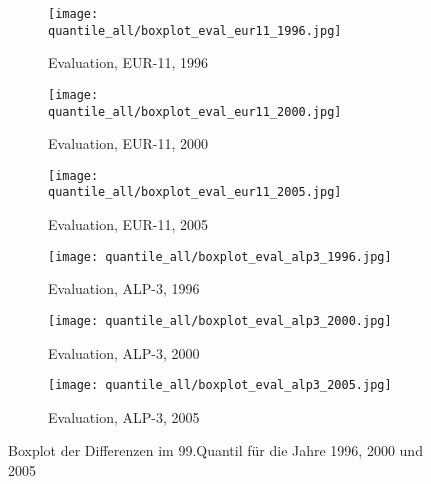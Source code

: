 \begin{figure}
	\begin{subfigure}{0.32\textwidth}
		\texttt{[image: quantile\_all/boxplot\_eval\_eur11\_1996.jpg]}
		\caption{Evaluation, EUR-11, 1996}
	\end{subfigure}
	\begin{subfigure}{0.32\textwidth}
		\texttt{[image: quantile\_all/boxplot\_eval\_eur11\_2000.jpg]}
		\caption{Evaluation, EUR-11, 2000}
	\end{subfigure}
	\begin{subfigure}{0.32\textwidth}
		\texttt{[image: quantile\_all/boxplot\_eval\_eur11\_2005.jpg]}
		\caption{Evaluation, EUR-11, 2005}
	\end{subfigure}
	\begin{subfigure}{0.32\textwidth}
		\texttt{[image: quantile\_all/boxplot\_eval\_alp3\_1996.jpg]}
		\caption{Evaluation, ALP-3, 1996}
	\end{subfigure}
	\begin{subfigure}{0.32\textwidth}
		\texttt{[image: quantile\_all/boxplot\_eval\_alp3\_2000.jpg]}
		\caption{Evaluation, ALP-3, 2000}
	\end{subfigure}
	\begin{subfigure}{0.32\textwidth}
		\texttt{[image: quantile\_all/boxplot\_eval\_alp3\_2005.jpg]}
		\caption{Evaluation, ALP-3, 2005}
	\end{subfigure}
	\caption{Boxplot der Differenzen im 99.Quantil für die Jahre 1996, 2000 und 2005}
	\label{fig:quantile_all_boxplot_all_years_2}
\end{figure}
